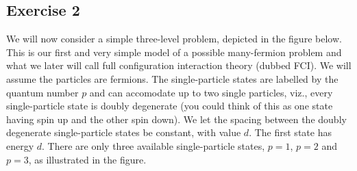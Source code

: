 \documentclass[prc]{revtex4}
\begin{document}
\subsection*{Exercise 2}
We will now consider a simple three-level problem, depicted in the figure below. This is our first and very simple model of a possible many-fermion problem and what we later will call full configuration interaction theory (dubbed FCI).
We will assume the particles are fermions.
The single-particle states are labelled by the quantum number $p$ and can accomodate up to two single particles, 
viz., every single-particle state 
is doubly degenerate (you could think of this as one state having spin up and the other spin down). 
We let the spacing between the doubly degenerate single-particle states be constant, with value $d$.  The first state
has energy $d$. There are only three available single-particle states, $p=1$, $p=2$ and $p=3$, as illustrated
in the figure. 
\end{document}
